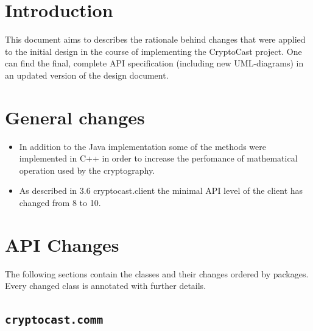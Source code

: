 \documentclass[a4paper,10pt]{scrartcl}
\title{\doctitle}
\author{\authorName}
\date{\today}
\begin{document}

\tableofcontents
\clearpage

\section{Introduction}
This document aims to describes the rationale behind changes that were applied to the initial design
in the course of implementing the CryptoCast project. One can find the final, complete API specification (including new UML-diagrams)
in an updated version of the design document.

\section{General changes}
\begin{itemize}
   \item In addition to the Java implementation some of the methods were implemented in C++ in order to increase the perfomance
	of mathematical operation used by the cryptography.
   \item As described in 3.6 cryptocast.client the minimal API level of the client has changed from 8 to 10.
\end{itemize}

\section{API Changes}
The following sections contain the classes and their changes ordered by packages. Every
changed class is annotated with further details.
\subsection{\lstinline|cryptocast.comm|}
\end{document}
